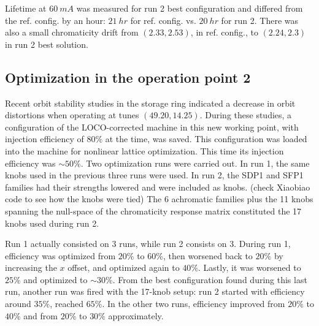 \documentclass[a4paper,
               keeplastbox,   %
               ]{jacow}
\begin{document}
Lifetime at $60~\unit{mA}$ was measured for run 2 best configuration and differed from the ref. config. by an hour: $21~\unit{hr}$ for ref. config. vs. $20~\unit{hr}$ for run 2. There was also a small chromaticity drift from $(2.33, 2.53)$, in ref. config., to $(2.24, 2.3)$ in run 2 best solution.  

\subsection{Optimization in the operation point 2}
 Recent orbit stability studies in the storage ring indicated a decrease in orbit distortions when operating at tunes $(49.20, 14.25)$. During these studies, a configuration of the LOCO-corrected machine in this new working point, with injection efficiency of $80\%$ at the time, was saved. This configuration was loaded into the machine for nonlinear lattice optimization. This time its injection efficiency was $\sim50\%$. Two optimization runs were carried out. In run 1, the same knobs used in the previous three runs were used. In run 2, the SDP1 and SFP1 families had their strengths lowered and were included as knobs. (check Xiaobiao code to see how the knobs were tied) The 6 achromatic families plus the 11 knobs spanning the null-space of the chromaticity response matrix constituted the 17 knobs used during run 2.
 
 Run 1 actually consisted on 3 runs, while run 2 consists on 3. During run 1, efficiency was optimized from $20\%$ to $60\%$, then worsened back to $20\%$ by increasing the $x$ offset, and optimized again to $40\%$. Lastly, it was worsened to $25\%$ and optimized to $\sim30\%$. From the best configuration found during this last run, another run was fired with the 17-knob setup: run 2 started with efficiency around $35\%$, reached $65\%$. In the other two runs, efficiency improved from $20\%$ to $40\%$ and from $20\%$ to $30\%$ approximately.
\end{document}
